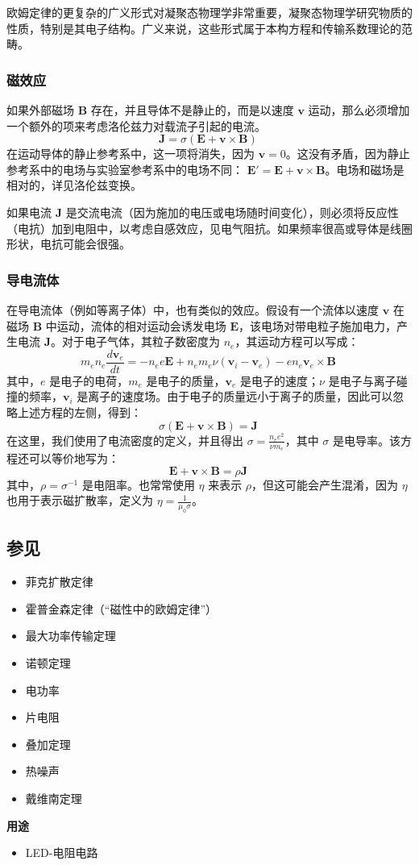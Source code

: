 欧姆定律的更复杂的广义形式对凝聚态物理学非常重要，凝聚态物理学研究物质的性质，特别是其电子结构。广义来说，这些形式属于本构方程和传输系数理论的范畴。
\subsubsection{磁效应}  
如果外部磁场 \( \mathbf{B} \) 存在，并且导体不是静止的，而是以速度 \( \mathbf{v} \) 运动，那么必须增加一个额外的项来考虑洛伦兹力对载流子引起的电流。  
\[
\mathbf{J} = \sigma (\mathbf{E} + \mathbf{v} \times \mathbf{B})~
\]  
在运动导体的静止参考系中，这一项将消失，因为 \( \mathbf{v} = 0 \)。这没有矛盾，因为静止参考系中的电场与实验室参考系中的电场不同： \( \mathbf{E'} = \mathbf{E} + \mathbf{v} \times \mathbf{B} \)。电场和磁场是相对的，详见洛伦兹变换。  

如果电流 \( \mathbf{J} \) 是交流电流（因为施加的电压或电场随时间变化），则必须将反应性（电抗）加到电阻中，以考虑自感效应，见电气阻抗。如果频率很高或导体是线圈形状，电抗可能会很强。
\subsubsection{导电流体}  
在导电流体（例如等离子体）中，也有类似的效应。假设有一个流体以速度 \( \mathbf{v} \) 在磁场 \( \mathbf{B} \) 中运动，流体的相对运动会诱发电场 \( \mathbf{E} \)，该电场对带电粒子施加电力，产生电流 \( \mathbf{J} \)。对于电子气体，其粒子数密度为 \( n_e \)，其运动方程可以写成：  
\[
m_e n_e \frac{d \mathbf{v}_e}{dt} = -n_e e \mathbf{E} + n_e m_e \nu (\mathbf{v}_i - \mathbf{v}_e) - e n_e \mathbf{v}_e \times \mathbf{B}~
\]
其中，\( e \) 是电子的电荷，\( m_e \) 是电子的质量，\( \mathbf{v}_e \) 是电子的速度；\( \nu \) 是电子与离子碰撞的频率，\( \mathbf{v}_i \) 是离子的速度场。由于电子的质量远小于离子的质量，因此可以忽略上述方程的左侧，得到：  
\[
\sigma (\mathbf{E} + \mathbf{v} \times \mathbf{B}) = \mathbf{J}~
\]
在这里，我们使用了电流密度的定义，并且得出 \( \sigma = \frac{n_e e^2}{\nu m_e} \)，其中 \( \sigma \) 是电导率。该方程还可以等价地写为：  
\[
\mathbf{E} + \mathbf{v} \times \mathbf{B} = \rho \mathbf{J}~
\]
其中，\( \rho = \sigma^{-1} \) 是电阻率。也常常使用 \( \eta \) 来表示 \( \rho \)，但这可能会产生混淆，因为 \( \eta \) 也用于表示磁扩散率，定义为 \( \eta = \frac{1}{\mu_0 \sigma} \)。
\subsection{参见}   
\begin{itemize}
\item 菲克扩散定律  
\item 霍普金森定律（“磁性中的欧姆定律”）  
\item 最大功率传输定理  
\item 诺顿定理  
\item 电功率  
\item 片电阻  
\item 叠加定理  
\item 热噪声  
\item 戴维南定理  
\end{itemize}
\textbf{用途} 
\begin{itemize}
\item LED-电阻电路
\end{itemize}
